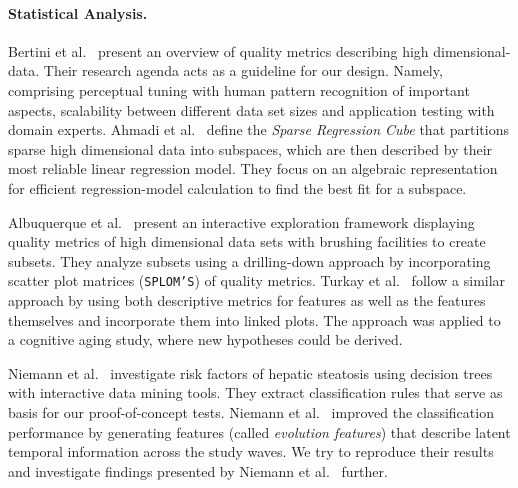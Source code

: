 \documentclass[journal]{style/vgtc} 			          %
\begin{document}
\paragraph{Statistical Analysis.}
Bertini et al.~\cite{Bertini} present an overview of quality metrics describing high dimensional-data.
Their research agenda acts as a guideline for our design.
Namely, comprising perceptual tuning with human pattern recognition of important aspects, scalability between different data set sizes and application testing with domain experts.
Ahmadi et al.~\cite{Ahmadi} define the \emph{Sparse Regression Cube} that partitions sparse high dimensional data into subspaces, which are then described by their most reliable linear regression model.
They focus on an algebraic representation for efficient regression-model calculation to find the best fit for a subspace.

Albuquerque et al.~\cite{Albuquerque} present an interactive exploration framework displaying quality metrics of high dimensional data sets with brushing facilities to create subsets.
They analyze subsets using a drilling-down approach by incorporating scatter plot matrices (\texttt{SPLOM'S}) of quality metrics. %
Turkay et al.~\cite{Turkay} follow a similar approach by using both descriptive metrics for features as well as the features themselves and incorporate them into linked plots.
The approach was applied to a cognitive aging study, where new hypotheses could be derived.

Niemann et al.~\cite{Niemann2014} investigate risk factors of hepatic steatosis using decision trees with interactive data mining tools.
They extract classification rules that serve as basis for our proof-of-concept tests.
Niemann et al.~\cite{Niemann2015} improved the classification performance by generating features (called \emph{evolution features}) that describe latent temporal information across the study waves.
We try to reproduce their results and investigate findings presented by Niemann et al.~\cite{Niemann2014} further.
\end{document}
